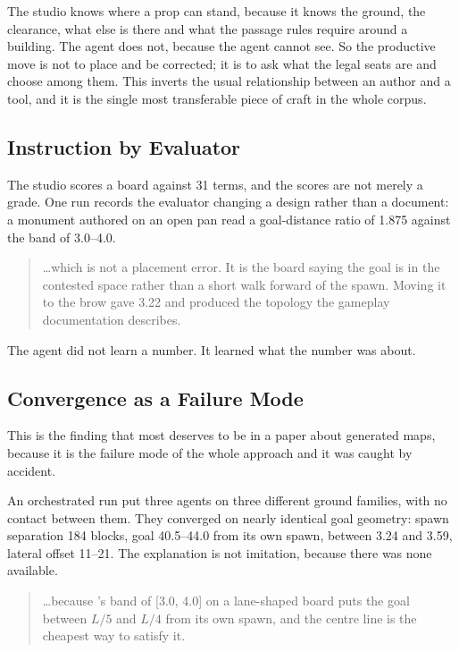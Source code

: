 The studio knows where a prop can stand, because it knows the ground, the
clearance, what else is there and what the passage rules require around a
building. The agent does not, because the agent cannot see. So the productive move is not to place and
be corrected; it is to ask what the legal seats are and choose among them. This
inverts the usual relationship between an author and a tool, and it is the single
most transferable piece of craft in the whole corpus.

\subsection{Instruction by Evaluator}

The studio scores a board against 31 terms, and the scores are not merely a grade.
One run records the evaluator changing a design rather than a document: a monument
authored on an open pan read a goal-distance ratio of 1.875 against the
 band of 3.0--4.0.

\begin{quote}
\ldots which is not a placement error. It is the board saying the goal is in the
contested space rather than a short walk forward of the spawn. Moving it to
the brow gave 3.22 and produced the topology the gameplay documentation describes.
\end{quote}

The agent did not learn a number. It learned what the number was about.

\subsection{Convergence as a Failure Mode}

This is the finding that most deserves to be in a paper about generated maps,
because it is the failure mode of the whole approach and it was caught by
accident.

An orchestrated run put three agents on three different ground families, with no
contact between them. They converged on nearly identical goal geometry: spawn
separation 184 blocks, goal 40.5--44.0 from its own spawn,  between 3.24
and 3.59, lateral offset 11--21. The explanation is not imitation, because there
was none available.

\begin{quote}
\ldots because 's band of [3.0, 4.0] on a lane-shaped board puts the goal
between $L/5$ and $L/4$ from its own spawn, and the centre line is the cheapest
way to satisfy it.
\end{quote}


